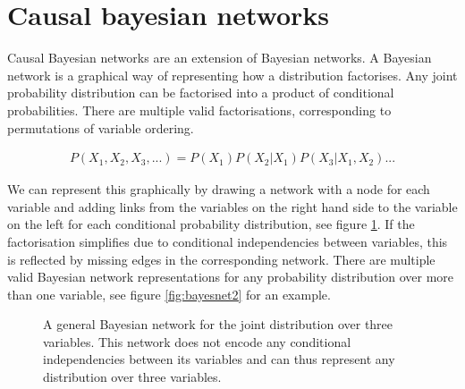 \documentclass[11pt,a4paper,oneside]{book}
\newcommand{\eqn}[1]{\begin{align}#1\end{align}}
\theoremstyle{plain}
\theoremstyle{definition}
\begin{document}
\section{Causal bayesian networks}

Causal Bayesian networks are an extension of Bayesian networks. A Bayesian network is a graphical way of representing how a distribution factorises. Any joint probability distribution can be factorised into a product of conditional probabilities. There are multiple valid factorisations, corresponding to permutations of variable ordering.

\eqn{
\label{eqn:cbn:joint_dist}
P(X_{1},X_{2},X_{3},...)=P(X_{1})P(X_{2}|X_{1})P(X_{3}|X_{1},X_{2})...
}

We can represent this graphically by drawing a network with a node for each variable and adding links from the variables on the right hand side to the variable on the left for each conditional probability distribution, see figure \ref{fig:bayesnet}. If the factorisation simplifies due to conditional independencies between variables, this is reflected by missing edges in the corresponding network. There are multiple valid Bayesian network representations for any probability distribution over more than one variable, see figure \ref{fig:bayesnet2} for an example. 

\begin{figure}[h]
\centering
\caption{A general Bayesian network for the joint distribution over three variables. This network does not encode any conditional independencies between its variables and can thus represent any distribution over three variables.}
\label{fig:bayesnet}
\end{figure}
\end{document}
